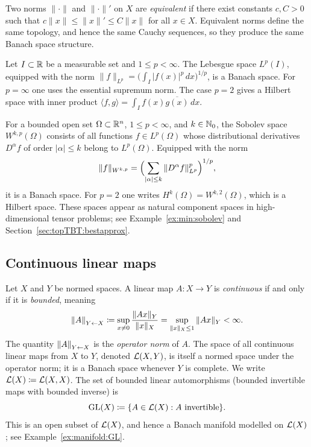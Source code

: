 Two norms $\|\cdot\|$ and $\|\cdot\|'$ on $X$ are \emph{equivalent} if
there exist constants $c, C > 0$ such that
$c\|x\| \leq \|x\|' \leq C\|x\|$ for all $x \in X$.
Equivalent norms define the same topology, and hence the same Cauchy
sequences, so they produce the same Banach space structure.

\begin{example}
\label{ex:banach:lp}
Let $I \subset \mathbb{R}$ be a measurable set and $1 \leq p < \infty$. The
Lebesgue space $L^p(I)$, equipped with the norm
$\|f\|_{L^p} = \bigl(\int_I |f(x)|^p\,dx\bigr)^{1/p}$,
is a Banach space. For $p = \infty$ one uses the essential supremum norm.
The case $p = 2$ gives a Hilbert space with inner product
$\langle f, g\rangle = \int_I f(x)\overline{g(x)}\,dx$.
\end{example}

\begin{example}
\label{ex:banach:sobolev}
For a bounded open set $\Omega \subset \mathbb{R}^n$, $1 \leq p < \infty$, and
$k \in \mathbb{N}_0$, the Sobolev space $W^{k,p}(\Omega)$ consists of all functions
$f \in L^p(\Omega)$ whose distributional derivatives $D^\alpha f$ of order
$|\alpha| \leq k$ belong to $L^p(\Omega)$. Equipped with the norm
\begin{equation*}
    \|f\|_{W^{k,p}} = \Bigl(\sum_{|\alpha| \leq k}
        \|D^\alpha f\|_{L^p}^p\Bigr)^{1/p},
\end{equation*}
it is a Banach space. For $p=2$ one writes $H^k(\Omega) = W^{k,2}(\Omega)$,
which is a Hilbert space. These spaces appear as natural component spaces in
high-dimensional tensor problems; see Example~\ref{ex:min:sobolev} and
Section~\ref{sec:topTBT:bestapprox}.
\end{example}

\subsection*{Continuous linear maps}

Let $X$ and $Y$ be normed spaces. A linear map $A: X \to Y$ is
\emph{continuous} if and only if it is \emph{bounded}, meaning
\begin{equation*}
    \left\|A\right\|_{Y \leftarrow X} \coloneqq \sup_{x \neq 0} \frac{\|Ax\|_Y}{\|x\|_X}
    = \sup_{\|x\|_X \leq 1} \|Ax\|_Y < \infty.
\end{equation*}
The quantity $\left\|A\right\|_{Y \leftarrow X}$ is the \emph{operator norm} of $A$.
The space of all continuous linear maps from $X$ to $Y$, denoted
$\mathcal{L}(X, Y)$, is itself a normed space under the operator norm; it is a
Banach space whenever $Y$ is complete. We write $\mathcal{L}(X) \coloneqq \mathcal{L}(X,X)$.
The set of bounded linear automorphisms (bounded invertible maps with
bounded inverse) is
\begin{equation*}
    \mathrm{GL}(X) \coloneqq \{A \in \mathcal{L}(X) : A \text{ invertible}\}.
\end{equation*}
This is an open subset of $\mathcal{L}(X)$, and hence a Banach manifold modelled
on $\mathcal{L}(X)$; see Example~\ref{ex:manifold:GL}.

